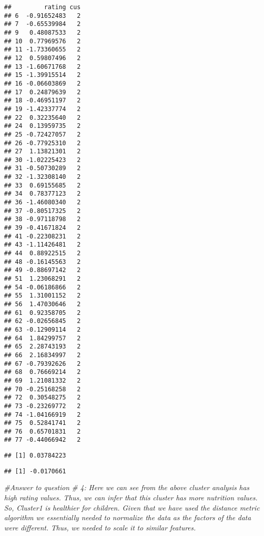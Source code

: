 \documentclass[
]{article}
\newenvironment{Shaded}{\begin{snugshade}}{\end{snugshade}}
\newcommand{\CommentTok}[1]{\textcolor[rgb]{0.56,0.35,0.01}{\textit{#1}}}
\newcommand{\DecValTok}[1]{\textcolor[rgb]{0.00,0.00,0.81}{#1}}
\newcommand{\FunctionTok}[1]{\textcolor[rgb]{0.00,0.00,0.00}{#1}}
\newcommand{\NormalTok}[1]{#1}
\newcommand{\SpecialCharTok}[1]{\textcolor[rgb]{0.00,0.00,0.00}{#1}}
\newcommand{\StringTok}[1]{\textcolor[rgb]{0.31,0.60,0.02}{#1}}
\begin{document}
\begin{verbatim}
##         rating cus
## 6  -0.91652483   2
## 7  -0.65539984   2
## 9   0.48087533   2
## 10  0.77969576   2
## 11 -1.73360655   2
## 12  0.59807496   2
## 13 -1.60671768   2
## 15 -1.39915514   2
## 16 -0.06603869   2
## 17  0.24879639   2
## 18 -0.46951197   2
## 19 -1.42337774   2
## 22  0.32235640   2
## 24  0.13959735   2
## 25 -0.72427057   2
## 26 -0.77925310   2
## 27  1.13821301   2
## 30 -1.02225423   2
## 31 -0.50730289   2
## 32 -1.32308140   2
## 33  0.69155685   2
## 34  0.78377123   2
## 36 -1.46080340   2
## 37 -0.80517325   2
## 38 -0.97118798   2
## 39 -0.41671824   2
## 41 -0.22308231   2
## 43 -1.11426481   2
## 44  0.88922515   2
## 48 -0.16145563   2
## 49 -0.88697142   2
## 51  1.23068291   2
## 54 -0.06186866   2
## 55  1.31001152   2
## 56  1.47030646   2
## 61  0.92358705   2
## 62 -0.02656845   2
## 63 -0.12909114   2
## 64  1.84299757   2
## 65  2.28743193   2
## 66  2.16834997   2
## 67 -0.79392626   2
## 68  0.76669214   2
## 69  1.21081332   2
## 70 -0.25168258   2
## 72  0.30548275   2
## 73 -0.23269772   2
## 74 -1.04166919   2
## 75  0.52841741   2
## 76  0.65701831   2
## 77 -0.44066942   2
\end{verbatim}

\begin{Shaded}
\end{Shaded}

\begin{verbatim}
## [1] 0.03784223
\end{verbatim}

\begin{Shaded}
\end{Shaded}

\begin{verbatim}
## [1] -0.0170661
\end{verbatim}

\begin{Shaded}
\begin{Highlighting}[]
\CommentTok{\#Answer to question \# 4: Here we can see from the above cluster analysis has high rating values. Thus, we can infer that this cluster has more nutrition values. So, Cluster1 is healthier for children. Given that we have used the distance metric algorithm we essentially needed to normalize the data as the factors of the data were different. Thus, we needed to scale it to similar features.}
\end{Highlighting}
\end{Shaded}
\end{document}
